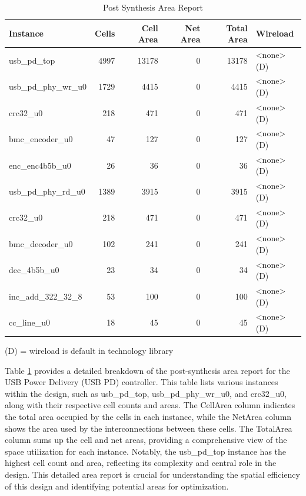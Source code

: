 \begin{table}[H]
\centering
\caption{Post Synthesis Area Report}
\begin{tabular}{|l|r|r|r|r|l|}
\hline
\textbf{Instance} & \textbf{Cells} & \textbf{Cell Area} & \textbf{Net Area} & \textbf{Total Area} & \textbf{Wireload} \\ \hline
usb\_pd\_top & 4997 & 13178 & 0 & 13178 & \textless none\textgreater (D) \\ \hline
\quad usb\_pd\_phy\_wr\_u0 & 1729 & 4415 & 0 & 4415 & \textless none\textgreater (D) \\ \hline
\quad \quad crc32\_u0 & 218 & 471 & 0 & 471 & \textless none\textgreater (D) \\ \hline
\quad \quad bmc\_encoder\_u0 & 47 & 127 & 0 & 127 & \textless none\textgreater (D) \\ \hline
\quad \quad enc\_enc4b5b\_u0 & 26 & 36 & 0 & 36 & \textless none\textgreater (D) \\ \hline
\quad usb\_pd\_phy\_rd\_u0 & 1389 & 3915 & 0 & 3915 & \textless none\textgreater (D) \\ \hline
\quad \quad crc32\_u0 & 218 & 471 & 0 & 471 & \textless none\textgreater (D) \\ \hline
\quad \quad bmc\_decoder\_u0 & 102 & 241 & 0 & 241 & \textless none\textgreater (D) \\ \hline
\quad \quad dec\_4b5b\_u0 & 23 & 34 & 0 & 34 & \textless none\textgreater (D) \\ \hline
inc\_add\_322\_32\_8 & 53 & 100 & 0 & 100 & \textless none\textgreater (D) \\ \hline
cc\_line\_u0 & 18 & 45 & 0 & 45 & \textless none\textgreater (D) \\ \hline
\end{tabular}
\label{table:syn_data}
\end{table}
(D) = wireload is default in technology library

Table \ref{table:syn_data} provides a detailed breakdown of the post-synthesis area report for the USB Power Delivery (USB PD) controller. This table lists various instances within the design, such as usb\_pd\_top, usb\_pd\_phy\_wr\_u0, and crc32\_u0, along with their respective cell counts and areas. The CellArea column indicates the total area occupied by the cells in each instance, while the NetArea column shows the area used by the interconnections between these cells. The TotalArea column sums up the cell and net areas, providing a comprehensive view of the space utilization for each instance. Notably, the usb\_pd\_top instance has the highest cell count and area, reflecting its complexity and central role in the design. This detailed area report is crucial for understanding the spatial efficiency of this design and identifying potential areas for optimization.


